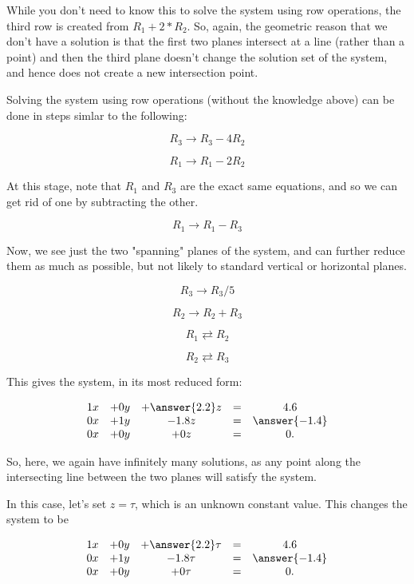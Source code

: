 \documentclass{ximera}
\begin{document}
    \begin{solution}

        While you don't need to know this to solve the system using row operations, the third row is created from $R_1+2*R_2$. So, again, the geometric reason that we don't have a solution is that the first two planes intersect at a line (rather than a point) and then the third plane doesn't change the solution set of the system, and hence does not create a new intersection point.

        Solving the system using row operations (without the knowledge above) can be done in steps simlar to the following:

        $$R_3\rightarrow R_3-4R_2$$

        $$R_1\rightarrow R_1-2R_2$$

        At this stage, note that $R_1$ and $R_3$ are the exact same equations, and so we can get rid of one by subtracting the other.

        $$R_1\rightarrow R_1-R_3$$

        Now, we see just the two "spanning" planes of the system, and can further reduce them as much as possible, but not likely to standard vertical or horizontal planes.

        $$R_3\rightarrow R_3/5$$

        $$R_2\rightarrow R_2+R_3$$

        $$R_1\rightleftarrows R_2$$

        $$R_2\rightleftarrows R_3$$

        This gives the system, in its most reduced form:

        $$\begin{array}{ccccccc}
            1x& +0y&+\answer{2.2}z &=&4.6 \\
            0x&+1y& -1.8z& =&\answer{-1.4}\\
            0x &+0y &+0z &=&0.
        \end{array}$$

        So, here, we again have infinitely many solutions, as any point along the intersecting line between the two planes will satisfy the system.

        In this case, let's set $z=\tau$, which is an unknown constant value. This changes the system to be 

        $$\begin{array}{ccccccc}
            1x& +0y&+\answer{2.2}\tau &=&4.6 \\
            0x&+1y& -1.8\tau& =&\answer{-1.4}\\
            0x &+0y &+0\tau &=&0.
        \end{array}$$


\end{solution}
\end{document}
